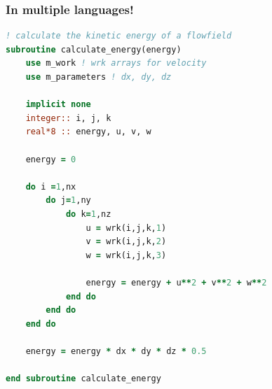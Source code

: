 \documentclass{beamer}
\begin{document}
\begin{frame}[fragile]
    \frametitle{In multiple languages!}

\begin{lstlisting}[language=fortran]
! calculate the kinetic energy of a flowfield
subroutine calculate_energy(energy)
    use m_work ! wrk arrays for velocity
    use m_parameters ! dx, dy, dz

    implicit none
    integer:: i, j, k
    real*8 :: energy, u, v, w

    energy = 0

    do i =1,nx
        do j=1,ny
            do k=1,nz
                u = wrk(i,j,k,1)
                v = wrk(i,j,k,2)
                w = wrk(i,j,k,3)

                energy = energy + u**2 + v**2 + w**2
            end do
        end do
    end do

    energy = energy * dx * dy * dz * 0.5

end subroutine calculate_energy
\end{lstlisting}


\end{frame}
\end{document}
